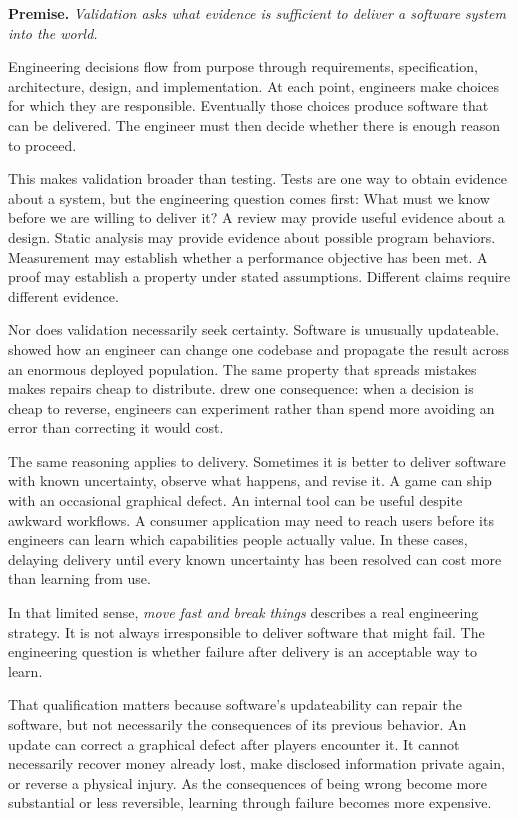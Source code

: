\textbf{Premise.} \emph{Validation asks what evidence is sufficient to deliver a software system into the
world.}

Engineering decisions flow from purpose through requirements, specification, architecture, design,
and implementation. At each point, engineers make choices for which they are responsible.
Eventually those choices produce software that can be delivered. The engineer must then decide
whether there is enough reason to proceed.

This makes validation broader than testing. Tests are one way to obtain evidence about a system,
but the engineering question comes first: What must we know before we are willing to deliver it? A
review may provide useful evidence about a design. Static analysis may provide evidence about
possible program behaviors. Measurement may establish whether a performance objective has been met.
A proof may establish a property under stated assumptions. Different claims require different
evidence.

Nor does validation necessarily seek certainty. Software is unusually updateable.
\citet{ch-software-engineering} showed how an engineer can change one codebase and propagate the result
across an enormous deployed population. The same property that spreads mistakes makes repairs cheap
to distribute. \citet{ch-process} drew one consequence: when a decision is cheap to reverse, engineers can
experiment rather than spend more avoiding an error than correcting it would cost.

The same reasoning applies to delivery. Sometimes it is better to deliver software with known
uncertainty, observe what happens, and revise it. A game can ship with an occasional graphical
defect. An internal tool can be useful despite awkward workflows. A consumer application may need
to reach users before its engineers can learn which capabilities people actually value. In these
cases, delaying delivery until every known uncertainty has been resolved can cost more than
learning from use.

In that limited sense, \emph{move fast and break things} describes a real engineering strategy. It is
not always irresponsible to deliver software that might fail. The engineering question is whether
failure after delivery is an acceptable way to learn.

That qualification matters because software's updateability can repair the software, but not
necessarily the consequences of its previous behavior. An update can correct a graphical defect
after players encounter it. It cannot necessarily recover money already lost, make disclosed
information private again, or reverse a physical injury. As the consequences of being wrong become
more substantial or less reversible, learning through failure becomes more expensive.

